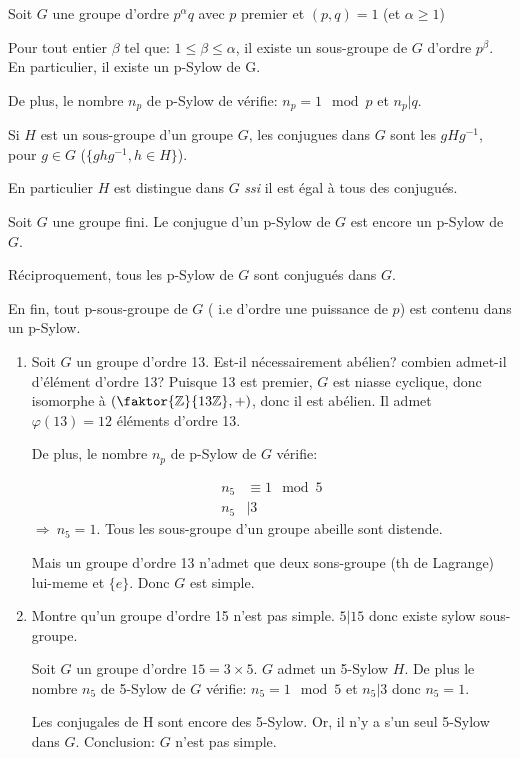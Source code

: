 \begin{theorem} Soit $G$ une groupe d'ordre $p^\alpha q$ avec $p$ premier et $(p, q)= 1$ (et $\alpha \geq 1$)

Pour tout entier $\beta$ tel que: $1\leq \beta \leq \alpha$, il existe un sous-groupe de $G$ d'ordre $p^\beta$. En particulier, il existe un p-Sylow de G.

De plus, le nombre $n_p$ de p-Sylow de vérifie:
$n_p = 1 \mod p$ et $n_p | q$.

\end{theorem}

\begin{definition}
	Si $H$ est un sous-groupe d'un groupe $G$, les conjugues dans $G$ sont les $gHg^{-1}$, pour $g\in G$ ($\{ghg^{-1}, h\in H\}$).
\end{definition}

En particulier $H$ est distingue dans $G$ \emph{ssi} il est égal à tous des conjugués.

\begin{theorem}
Soit $G$ une groupe fini.
Le conjugue d'un p-Sylow de $G$ est encore un p-Sylow de $G$.

Réciproquement, tous les p-Sylow de $G$ sont conjugués dans $G$.

En fin, tout p-sous-groupe de $G$ ( i.e d'ordre une puissance de $p$) est contenu dans un p-Sylow.
\end{theorem}

\begin{exercise}
\begin{enumerate}
	\item Soit $G$ un groupe d'ordre 13. Est-il nécessairement abélien? combien admet-il d'élément d'ordre 13?
	Puisque 13 est premier, $G$ est niasse cyclique, donc isomorphe à $(\faktor{\mathbb{Z}}{13\mathbb{Z}},+)$, donc il est abélien. Il admet $\varphi(13)=12$ éléments d'ordre 13.
	
	De plus, le nombre $n_p$ de p-Sylow de $G$ vérifie:
	
	\begin{align*}
		n_5  &\equiv 1  \mod 5\\ n_5 &| 3
	\end{align*}
	$\Rightarrow\ n_5 = 1$.
	Tous les sous-groupe d'un groupe abeille sont distende.
	
	Mais un groupe d'ordre 13 n'admet que deux sons-groupe (th de Lagrange) lui-meme et $\{e\}$. Donc $G$ est simple.
	\item Montre qu'un groupe d'ordre 15 n'est pas simple. $5|15$ donc existe sylow sous-groupe. 
	
	Soit $G$ un groupe d'ordre $15=3\times 5$. $G$ admet un 5-Sylow $H$. De plus le nombre $n_5$ de 5-Sylow de $G$ vérifie: $n_5=1 \mod 5$ et $n_5 | 3$ donc $n_5=1$.
	
	Les conjugales de H sont encore des 5-Sylow. Or, il n'y a s'un seul 5-Sylow dans $G$. Conclusion: $G$ n'est pas simple.
\end{enumerate}
\end{exercise}


